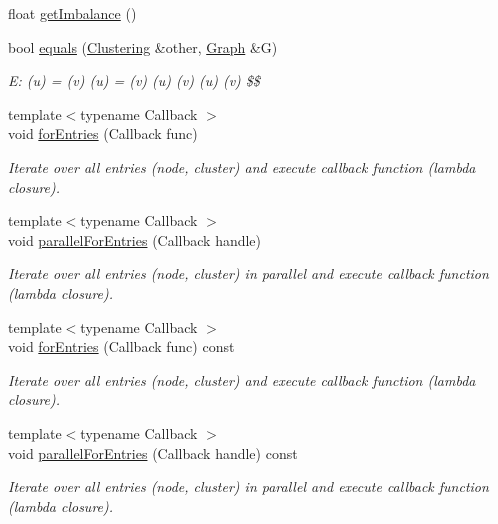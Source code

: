 \begin{DoxyCompactItemize}
float \hyperlink{class_networ_kit_1_1_clustering_aef712182c44adf66605ddf5abc2d1fbf}{get\-Imbalance} ()
\item 
bool \hyperlink{class_networ_kit_1_1_clustering_a6d544799c96254b1ec6600b1b23c0fe7}{equals} (\hyperlink{class_networ_kit_1_1_clustering}{Clustering} \&other, \hyperlink{class_networ_kit_1_1_graph}{Graph} \&G)
\begin{DoxyCompactList}\small\item\em E\-: (u) = (v)  (u) = (v)  (u)  (v)  (u)  (v) \$\$ \end{DoxyCompactList}\item 
{\footnotesize template$<$typename Callback $>$ }\\void \hyperlink{class_networ_kit_1_1_clustering_a9035412a53ac05e759d9bf03ae7f3940}{for\-Entries} (Callback func)
\begin{DoxyCompactList}\small\item\em Iterate over all entries (node, cluster) and execute callback function (lambda closure). \end{DoxyCompactList}\item 
{\footnotesize template$<$typename Callback $>$ }\\void \hyperlink{class_networ_kit_1_1_clustering_a355a49ca8f9d3db188bed8f0812e6e79}{parallel\-For\-Entries} (Callback handle)
\begin{DoxyCompactList}\small\item\em Iterate over all entries (node, cluster) in parallel and execute callback function (lambda closure). \end{DoxyCompactList}\item 
{\footnotesize template$<$typename Callback $>$ }\\void \hyperlink{class_networ_kit_1_1_clustering_a98107933f1dd9a7ee0603027561806a0}{for\-Entries} (Callback func) const 
\begin{DoxyCompactList}\small\item\em Iterate over all entries (node, cluster) and execute callback function (lambda closure). \end{DoxyCompactList}\item 
{\footnotesize template$<$typename Callback $>$ }\\void \hyperlink{class_networ_kit_1_1_clustering_a6990f6b8c4c12b410eb04b5ea27a40e1}{parallel\-For\-Entries} (Callback handle) const 
\begin{DoxyCompactList}\small\item\em Iterate over all entries (node, cluster) in parallel and execute callback function (lambda closure). \end{DoxyCompactList}\item 

\end{DoxyCompactItemize}
